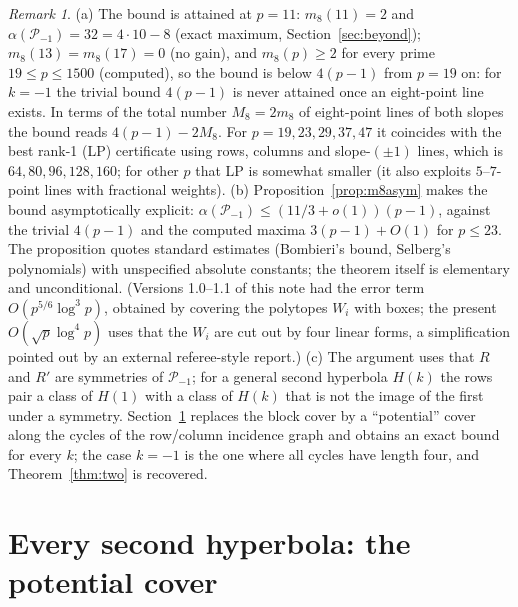 \documentclass[11pt]{article}
\theoremstyle{remark}
\newtheorem{remark}[theorem]{Remark}
\newcommand{\Pset}{\mathcal{P}}
\begin{document}
\begin{remark}
(a) The bound is attained at $p=11$: $m_8(11)=2$ and $\alpha(\Pset_{-1})=32=4\cdot10-8$ (exact maximum, Section~\ref{sec:beyond});
$m_8(13)=m_8(17)=0$ (no gain), and $m_8(p)\ge2$ for every prime $19\le p\le1500$ (computed), so the bound is below $4(p-1)$ from
$p=19$ on: for $k=-1$ the trivial bound $4(p-1)$ is never attained once an eight-point line exists.  In terms of the total number
$M_8=2m_8$ of eight-point lines of both slopes the bound reads $4(p-1)-2M_8$.  For $p=19,23,29,37,47$ it coincides with the best rank-1 (LP) certificate using rows, columns and slope-$(\pm1)$ lines,
which is $64,80,96,128,160$; for other $p$ that LP is somewhat smaller (it also exploits $5$--$7$-point lines with fractional weights).
(b) Proposition~\ref{prop:m8asym} makes the bound asymptotically explicit: $\alpha(\Pset_{-1})\le(11/3+o(1))(p-1)$, against the
trivial $4(p-1)$ and the computed maxima $3(p-1)+O(1)$ for $p\le23$.  The proposition quotes standard estimates (Bombieri's bound, Selberg's
polynomials) with unspecified absolute constants; the theorem itself is elementary and unconditional.  (Versions 1.0--1.1 of this note
had the error term $O(p^{5/6}\log^3p)$, obtained by covering the polytopes $W_i$ with boxes; the present $O(\sqrt p\log^4p)$ uses that
the $W_i$ are cut out by four linear forms, a simplification pointed out by an external referee-style report.)
(c) The argument uses that $R$ and $R'$ are symmetries of $\Pset_{-1}$; for a general second hyperbola $H(k)$ the rows pair a class of
$H(1)$ with a class of $H(k)$ that is not the image of the first under a symmetry.  Section~\ref{sec:general} replaces the block cover by a
``potential'' cover along the cycles of the row/column incidence graph and obtains an exact bound for every $k$; the case $k=-1$ is the one
where all cycles have length four, and Theorem~\ref{thm:two} is recovered.
\end{remark}






\section{Every second hyperbola: the potential cover}\label{sec:general}
\end{document}
